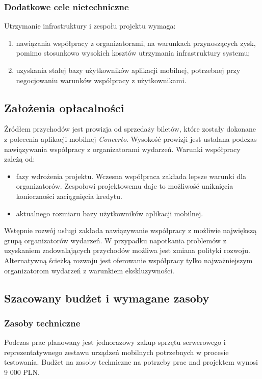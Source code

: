 \subsubsection{Dodatkowe cele nietechniczne}
Utrzymanie infrastruktury i zespołu projektu wymaga:
\begin{enumerate}
    \item nawiązania współpracy z organizatorami, na warunkach
        przynoszących zysk, pomimo stosunkowo wysokich kosztów utrzymania
        infrastruktury systemu;
    \item uzyskania stałej bazy użytkowników aplikacji mobilnej,
        potrzebnej przy negocjowaniu warunków współpracy z użytkownikami.
\end{enumerate}

\subsection{Założenia opłacalności}
Źródłem przychodów jest prowizja od sprzedaży biletów, które zostały dokonane z
polecenia aplikacji mobilnej \emph{Concerto}. Wysokość prowizji jest ustalana
podczas nawiązywania współpracy z organizatorami wydarzeń. Warunki współpracy
zależą od:
\begin{itemize}
    \item fazy wdrożenia projektu. Wczesna współpraca zakłada lepsze warunki
        dla organizatorów. Zespołowi projektowemu daje to możliwość uniknięcia
        konieczności zaciągnięcia kredytu.
    \item aktualnego rozmiaru bazy użytkowników aplikacji mobilnej.
\end{itemize}
Wstępnie rozwój usługi zakłada nawiązywanie współpracy z możliwie największą
grupą organizatorów wydarzeń. W przypadku napotkania problemów z uzyskaniem
zadowalających przychodów możliwa jest zmiana polityki rozwoju. Alternatywną
ścieżką rozwoju jest oferowanie współpracy tylko najważniejszym organizatorom
wydarzeń z warunkiem ekskluzywności.

\subsection{Szacowany budżet i wymagane zasoby}

\subsubsection{Zasoby techniczne}
Podczas prac planowany jest jednorazowy zakup sprzętu serwerowego i
reprezentatywnego zestawu urządzeń mobilnych potrzebnych w procesie testowania.
Budżet na zasoby techniczne na potrzeby prac nad projektem wynosi 9 000 PLN.

